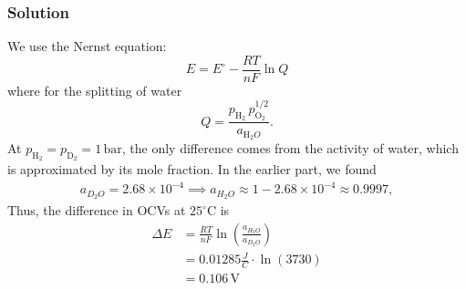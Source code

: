 \documentclass[12pt]{article}
\begin{document}
\subsubsection{Solution}
We use the Nernst equation:
\begin{equation}
E = E^\circ - \frac{RT}{nF} \ln Q
\end{equation}
where for the splitting of water
\begin{equation}
Q = \frac{p_{\mathrm{H}_2} \, p_{\mathrm{O}_2}^{1/2}}{a_{\mathrm{H}_2O}}.
\end{equation}
At $p_{\mathrm{H}_2} = p_{\mathrm{D}_2} = 1 \,\mathrm{bar}$, the only difference comes from the activity of water, which is approximated by its mole fraction. In the earlier part, we found
\begin{align}
a_{D_2O} = 2.68 \times 10^{-4} \implies a_{H_2O} \approx 1 - 2.68 \times 10^{-4} \approx 0.9997,   
\end{align}
Thus, the difference in OCVs at $25^{\circ} \mathrm{C}$ is
\begin{align}
\Delta E &= \frac{RT}{nF} \ln\!\left(\frac{a_{H_2O}}{a_{D_2O}}\right) \\
&= 0.01285 \frac{J}{C} \cdot \ln\!\left(3730\right) \\
&= 0.106 \,\mathrm{V}
\end{align}
\end{document}
